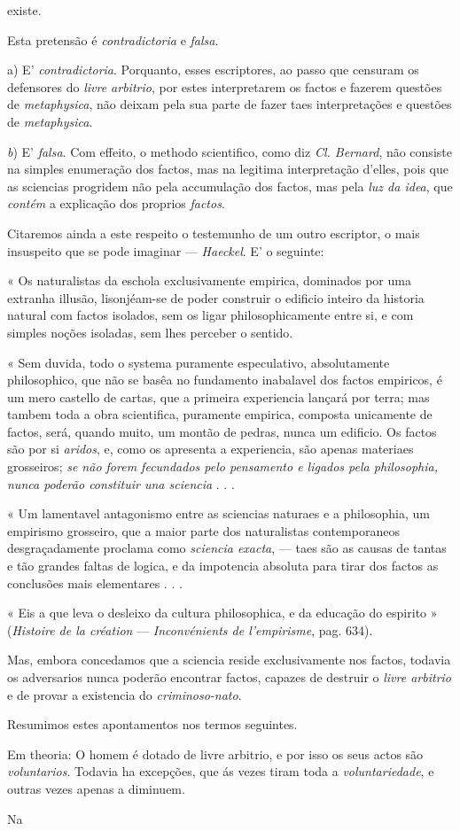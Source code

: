 existe.\par Esta pretensão é \emph{contradictoria} e \emph{falsa}.\par a) E' \emph{contradictoria}. Porquanto, esses escriptores, ao passo que censuram os defensores do \emph{livre arbitrio}, por estes interpretarem os factos e fazerem questões de \emph{metaphysica}, não deixam pela sua parte de fazer taes interpretações e questões de \emph{metaphysica}.\par \emph{b}) E' \emph{falsa}. Com effeito, o methodo scientifico, como diz \emph{Cl. Bernard}, não consiste na simples enumeração dos factos, mas na legitima interpretação d'elles, pois que as sciencias progridem não pela accumulação dos factos, mas pela \emph{luz da idea}, que \emph{contém} a explicação dos proprios \emph{factos}.\par Citaremos ainda a este respeito o testemunho de um outro escriptor, o mais insuspeito que se pode imaginar --- \emph{Haeckel}. E' o seguinte:\par « Os naturalistas da eschola exclusivamente empirica, dominados por uma extranha illusão, lisonjéam-se de poder construir o edificio inteiro da historia natural com factos isolados, sem os ligar philosophicamente entre si, e com simples noções isoladas, sem lhes perceber o sentido.\par « Sem duvida, todo o systema puramente especulativo, absolutamente philosophico, que não se basêa no fundamento inabalavel dos factos empiricos, é um mero castello de cartas, que a primeira experiencia lançará por terra; mas tambem toda a obra scientifica, puramente empirica, composta unicamente de factos, será, quando muito, um montão de pedras, nunca um edificio. Os factos são por si \emph{aridos}, e, como os apresenta a experiencia, são apenas materiaes grosseiros; \emph{se não forem fecundados pelo pensamento e ligados pela philosophia, nunca poderão constituir una sciencia} . . .\par « Um lamentavel antagonismo entre as sciencias naturaes e a philosophia, um empirismo grosseiro, que a maior parte dos naturalistas contemporaneos desgraçadamente proclama como \emph{sciencia exacta}, --- taes são as causas de tantas e tão grandes faltas de logica, e da impotencia absoluta para tirar dos factos as conclusões mais elementares . . .\par « Eis a que leva o desleixo da cultura philosophica, e da educação do espirito » (\emph{Histoire de la création} --- \emph{Inconvénients de l'empirisme}, pag. 634).\par Mas, embora concedamos que a sciencia reside exclusivamente nos factos, todavia os adversarios nunca poderão encontrar factos, capazes de destruir o \emph{livre arbitrio} e de provar a existencia do \emph{criminoso-nato}.\par *\par Resumimos estes apontamentos nos termos seguintes.\par Em theoria: O homem é dotado de livre arbitrio, e por isso os seus actos são \emph{voluntarios}. Todavia ha excepções, que ás vezes tiram toda a \emph{voluntariedade}, e outras vezes apenas a diminuem.\par Na 